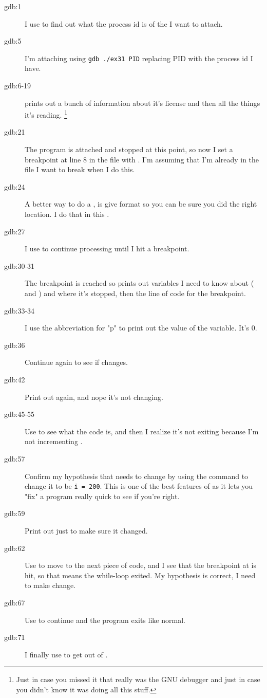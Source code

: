 \begin{description}
\item[gdb:1] I use  to find out what the process id is
    of the  I want to attach.
\item[gdb:5] I'm attaching using \verb|gdb ./ex31 PID| replacing PID with
    the process id I have.
\item[gdb:6-19]  prints out a bunch of information about it's
    license and then all the things it's reading. \footnote{Just in case you missed
    it that  really was the GNU debugger and just in case
    you didn't know it was doing all this stuff.}
\item[gdb:21] The program is attached and stopped at this point, so now I set
    a breakpoint at line 8 in the file with .
    I'm assuming that I'm already in the file I want to break when I do this.
\item[gdb:24] A better way to do a , is give  format
    so you can be sure you did the right location.  I do that in this .
\item[gdb:27] I use  to continue processing until I hit a breakpoint.
\item[gdb:30-31] The breakpoint is reached so  prints out variables
    I need to know about ( and ) and where it's stopped,
    then the line of code for the breakpoint.
\item[gdb:33-34] I use the abbreviation for  "p" to print out the value
    of the  variable.  It's 0.
\item[gdb:36] Continue again to see if  changes.
\item[gdb:42] Print out  again, and nope it's not changing.
\item[gdb:45-55] Use  to see what the code is, and then I realize
    it's not exiting because I'm not incrementing .
\item[gdb:57] Confirm my hypothesis that  needs to change by using the
     command to change it to be \verb|i = 200|.  This is one of the
    best features of  as it lets you "fix" a program really quick
    to see if you're right.
\item[gdb:59] Print out  just to make sure it changed.
\item[gdb:62] Use  to move to the next piece of code, and I see that
    the breakpoint at  is hit, so that means the while-loop
    exited.  My hypothesis is correct, I need to make  change.
\item[gdb:67] Use  to continue and the program exits like normal.
\item[gdb:71] I finally use  to get out of .
\end{description}

